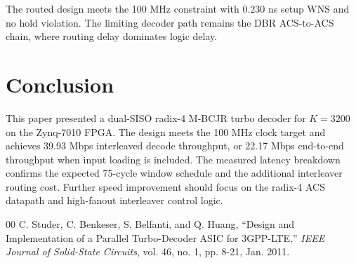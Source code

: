 \documentclass[conference]{IEEEtran}
\begin{document}
The routed design meets the 100 MHz constraint with 0.230 ns setup WNS and no hold violation. The limiting decoder path remains the DBR ACS-to-ACS chain, where routing delay dominates logic delay.

\section{Conclusion}
This paper presented a dual-SISO radix-4 M-BCJR turbo decoder for $K=3200$ on the Zynq-7010 FPGA. The design meets the 100 MHz clock target and achieves 39.93 Mbps interleaved decode throughput, or 22.17 Mbps end-to-end throughput when input loading is included. The measured latency breakdown confirms the expected 75-cycle window schedule and the additional interleaver routing cost. Further speed improvement should focus on the radix-4 ACS datapath and high-fanout interleaver control logic.

\begin{thebibliography}{00}
C. Studer, C. Benkeser, S. Belfanti, and Q. Huang, ``Design and Implementation of a Parallel Turbo-Decoder ASIC for 3GPP-LTE,'' \textit{IEEE Journal of Solid-State Circuits}, vol. 46, no. 1, pp. 8-21, Jan. 2011.
\end{thebibliography}
\end{document}
